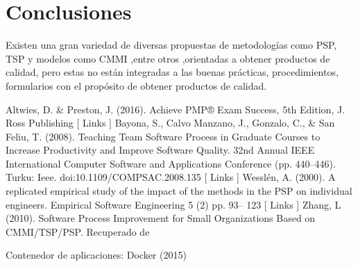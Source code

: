 \documentclass[twoside,twocolumn]{article}
\begin{document}
\section{Conclusiones}
Existen una gran variedad  de diversas propuestas de metodologías como PSP, TSP y modelos como CMMI ,entre otros ,orientadas a obtener productos de calidad, pero estas no están integradas a las buenas prácticas, procedimientos, formularios con el propósito de obtener productos de calidad.



\begin{thebibliography}{99} %

Altwies, D. & Preston, J. (2016). Achieve PMP® Exam Success, 5th Edition, J. Ross Publishing        [ Links ]
Bayona, S., Calvo Manzano, J., Gonzalo, C., & San Feliu, T. (2008). Teaching Team Software Process in Graduate Courses to Increase Productivity and Improve Software Quality. 32nd Annual IEEE International Computer Software and Applications Conference (pp. 440–446). Turku: Ieee. doi:10.1109/COMPSAC.2008.135        [ Links ]
Wesslén, A. (2000). A replicated empirical study of the impact of the methods in the PSP on individual engineers. Empirical Software Engineering 5 (2) pp. 93– 123        [ Links ]
Zhang, L (2010). Software Process Improvement for Small Organizations Based on CMMI/TSP/PSP. Recuperado de 
 
\newblock Contenedor de aplicaciones: Docker (2015)
\end{thebibliography}

\end{document}
